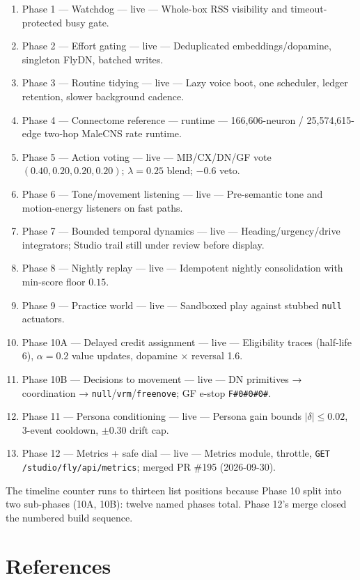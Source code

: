 \documentclass[11pt]{article}
\begin{document}
\begin{enumerate}[leftmargin=*]
\item Phase 1 — Watchdog --- live --- Whole-box RSS visibility and timeout-protected busy gate.
\item Phase 2 — Effort gating --- live --- Deduplicated embeddings/dopamine, singleton FlyDN, batched writes.
\item Phase 3 — Routine tidying --- live --- Lazy voice boot, one scheduler, ledger retention, slower background cadence.
\item Phase 4 — Connectome reference --- runtime --- 166,606-neuron / 25,574,615-edge two-hop MaleCNS rate runtime.
\item Phase 5 — Action voting --- live --- MB/CX/DN/GF vote \((0.40,0.20,0.20,0.20)\); \(\lambda=0.25\) blend; \(-0.6\) veto.
\item Phase 6 — Tone/movement listening --- live --- Pre-semantic tone and motion-energy listeners on fast paths.
\item Phase 7 — Bounded temporal dynamics --- live --- Heading/urgency/drive integrators; Studio trail still under review before display.
\item Phase 8 — Nightly replay --- live --- Idempotent nightly consolidation with min-score floor \(0.15\).
\item Phase 9 — Practice world --- live --- Sandboxed play against stubbed \texttt{null} actuators.
\item Phase 10A — Delayed credit assignment --- live --- Eligibility traces (half-life 6), \(\alpha=0.2\) value updates, dopamine × reversal 1.6.
\item Phase 10B — Decisions to movement --- live --- DN primitives → coordination → \texttt{null}/\texttt{vrm}/\texttt{freenove}; GF e-stop \texttt{F\#0\#0\#0\#}.
\item Phase 11 — Persona conditioning --- live --- Persona gain bounds \(|\delta|\le 0.02\), 3-event cooldown, \(\pm 0.30\) drift cap.
\item Phase 12 — Metrics + safe dial --- live --- Metrics module, throttle, \texttt{GET /studio/fly/api/metrics}; merged PR \#195 (2026-09-30).
\end{enumerate}

The timeline counter runs to thirteen list positions because Phase 10 split into two sub-phases (10A, 10B): twelve named phases total. Phase 12's merge closed the numbered build sequence.

\section*{References}
\end{document}
